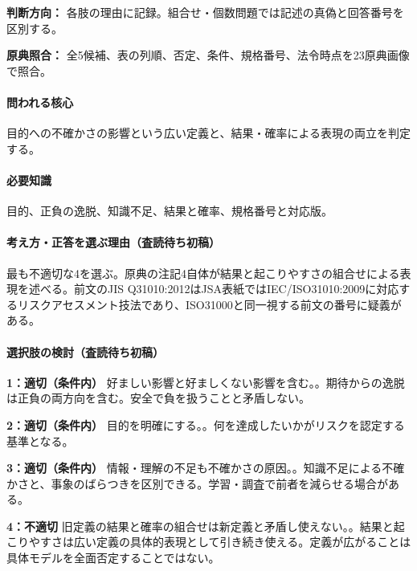 \noindent\textbf{判断方向：} 各肢の理由に記録。組合せ・個数問題では記述の真偽と回答番号を区別する。\par

\noindent\textbf{原典照合：} 全5候補、表の列順、否定、条件、規格番号、法令時点を23原典画像で照合。\par

\paragraph{問われる核心} 目的への不確かさの影響という広い定義と、結果・確率による表現の両立を判定する。

\paragraph{必要知識} 目的、正負の逸脱、知識不足、結果と確率、規格番号と対応版。

\paragraph{考え方・正答を選ぶ理由（査読待ち初稿）} 最も不適切な4を選ぶ。原典の注記4自体が結果と起こりやすさの組合せによる表現を述べる。前文のJIS Q31010:2012はJSA表紙ではIEC/ISO31010:2009に対応するリスクアセスメント技法であり、ISO31000と同一視する前文の番号に疑義がある。

\paragraph{選択肢の検討（査読待ち初稿）}\mbox{}\par

\noindent\textbf{1：適切（条件内）} 好ましい影響と好ましくない影響を含む。。期待からの逸脱は正負の両方向を含む。安全で負を扱うことと矛盾しない。\par

\noindent\textbf{2：適切（条件内）} 目的を明確にする。。何を達成したいかがリスクを認定する基準となる。\par

\noindent\textbf{3：適切（条件内）} 情報・理解の不足も不確かさの原因。。知識不足による不確かさと、事象のばらつきを区別できる。学習・調査で前者を減らせる場合がある。\par

\noindent\textbf{4：不適切} 旧定義の結果と確率の組合せは新定義と矛盾し使えない。。結果と起こりやすさは広い定義の具体的表現として引き続き使える。定義が広がることは具体モデルを全面否定することではない。\par

